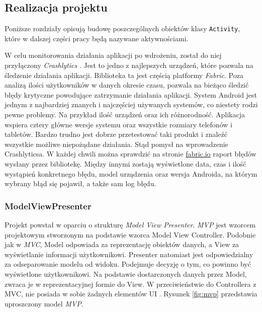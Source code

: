 \documentclass[twoside]{projektInzynierskiMS}
\begin{document}
\subsection{Realizacja projektu}

Poniższe rozdziały opisują budowę poszczególnych obiektów klasy \verb`Activity`, które w dalszej części pracy będą nazywane aktywnościami. 

W celu monitorowania działania aplikacji po wdrożeniu, został do niej przyłączony \textit{Crashlytics} \cite{crashlytics}. Jest to jedno z najlepszych urządzeń, które pozwala na śledzenie działania aplikacji. Biblioteka ta jest częścią platformy \textit{Fabric}. Poza analizą ilości użytkowników w danych okresie czasu, pozwala na bieżąco śledzić błędy krytyczne powodujące zatrzymanie działania aplikacji. System Android jest jednym z najbardziej znanych i najczęściej używanych systemów, co niestety rodzi pewne problemy. Na przykład ilość urządzeń oraz ich różnorodność. Aplikacja wspiera cztery główne wersje systemu oraz wszystkie rozmiary telefonów i tabletów. Bardzo trudno jest dobrze przetestować taki produkt i znaleźć wszystkie możliwe niepożądane działania. Stąd pomysł na wprowadzenie Crashlyticsa. W każdej chwili można sprawdzić na stronie \href{https://fabric.io/}{fabric.io} raport błędów wysłany przez bibliotekę. Między innymi zostają wyświetlone data, czas i ilość wystąpień konkretnego błędu, model urządzenia oraz wersja Androida, na którym wybrany błąd się pojawił, a także sam log błędu. 

\subsubsection{ModelViewPresenter}

Projekt powstał w oparciu o strukturę \textit{Model View Presenter}. \textit{MVP} jest wzorcem projektowym stworzonym na podstawie wzorca Model View Controller. Podobnie jak w \textit{MVC}, Model odpowiada za reprezentację obiektów danych, a View za wyświetlanie informacji użytkownikowi. Presenter natomiast jest odpowiedzialny za odseparowanie modelu od widoku. Podejmuje decyzję o tym, co powinno być wyświetlone użytkownikowi. Na podstawie dostarczonych danych przez Model, zwraca je w reprezentacyjnej formie do View. W przeciwieństwie do Controllera z MVC, nie posiada w sobie żadnych elementów UI \cite{mvpBook}. Rysunek \ref{fig:mvp} przedstawia uproszczony model \textit{MVP}.
\end{document}
